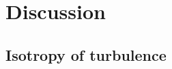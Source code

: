 \chapter{Discussion}
\label{chap: discussion}

\section{Isotropy of turbulence}
\label{sec: Isotropy of turbulence }
